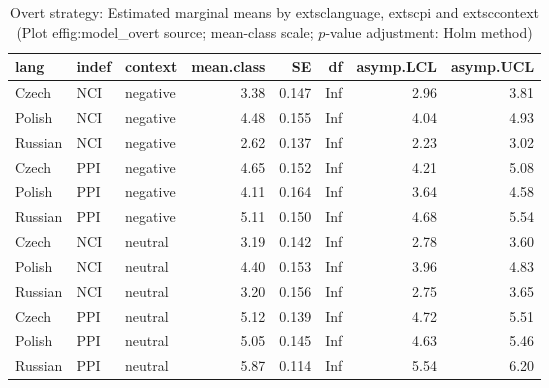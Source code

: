 \begin{table}[!h]
\centering
\caption{Overt strategy: Estimated marginal means by 	extsc{language}, 	extsc{pi} and 	extsc{context} (Plot 
ef{fig:model_overt} source; mean-class scale; $p$-value adjustment: Holm method)}
\centering
\begin{tabular}[t]{lllrrrrr}
\toprule
lang & indef & context & mean.class & SE & df & asymp.LCL & asymp.UCL\\
\midrule
Czech & NCI & negative & 3.38 & 0.147 & Inf & 2.96 & 3.81\\
Polish & NCI & negative & 4.48 & 0.155 & Inf & 4.04 & 4.93\\
Russian & NCI & negative & 2.62 & 0.137 & Inf & 2.23 & 3.02\\
Czech & PPI & negative & 4.65 & 0.152 & Inf & 4.21 & 5.08\\
Polish & PPI & negative & 4.11 & 0.164 & Inf & 3.64 & 4.58\\
\addlinespace
Russian & PPI & negative & 5.11 & 0.150 & Inf & 4.68 & 5.54\\
Czech & NCI & neutral & 3.19 & 0.142 & Inf & 2.78 & 3.60\\
Polish & NCI & neutral & 4.40 & 0.153 & Inf & 3.96 & 4.83\\
Russian & NCI & neutral & 3.20 & 0.156 & Inf & 2.75 & 3.65\\
Czech & PPI & neutral & 5.12 & 0.139 & Inf & 4.72 & 5.51\\
\addlinespace
Polish & PPI & neutral & 5.05 & 0.145 & Inf & 4.63 & 5.46\\
Russian & PPI & neutral & 5.87 & 0.114 & Inf & 5.54 & 6.20\\
\bottomrule
\end{tabular}
\end{table}
